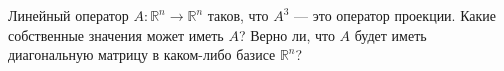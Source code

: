 \documentclass{article}
\begin{document}
Линейный оператор $A : \mathbb{R}^n \longrightarrow \mathbb{R}^n$ таков, что $A^3$ --- это оператор проекции. Какие собственные значения может иметь $A$? Верно ли, что $A$ будет иметь диагональную матрицу в каком-либо базисе $\mathbb{R}^n$?
\end{document}
